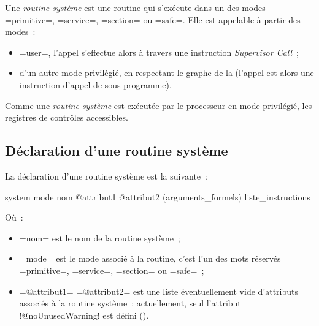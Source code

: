 %
%
%
%




















Une \emph{routine système} est une routine qui s'exécute dans un des modes \plm=primitive=, \plm=service=, \plm=section= ou \plm=safe=. Elle est appelable à partir des modes~:
\begin{itemize}
 \item \plm=user=, l'appel s'effectue alors à travers une instruction \emph{Supervisor Call}~;
  \item d'un autre mode privilégié, en respectant le graphe de la  (l'appel est alors une instruction d'appel de sous-programme).
\end{itemize}

Comme une \emph{routine système} est exécutée par le processeur en mode privilégié, les registres de contrôles accessibles.




\subsection{Déclaration d'une routine système}


La déclaration d'une routine système est la suivante~:
\begin{PLM}
system mode nom @attribut1 @attribut2 (arguments_formels) {
  liste_instructions
}
\end{PLM}
Où~:
\begin{itemize}
  \item \plm=nom= est le nom de la routine système~;
  \item \plm=mode= est le mode associé à la routine, c'est l'un des mots réservés \plm=primitive=, \plm=service=, \plm=section= ou \plm=safe=~;
  \item \plm=@attribut1= \plm=@attribut2= est une liste éventuellement vide d'attributs associés à la routine système~; actuellement, seul l'attribut \plm!@noUnusedWarning! est défini ().
\end{itemize}










